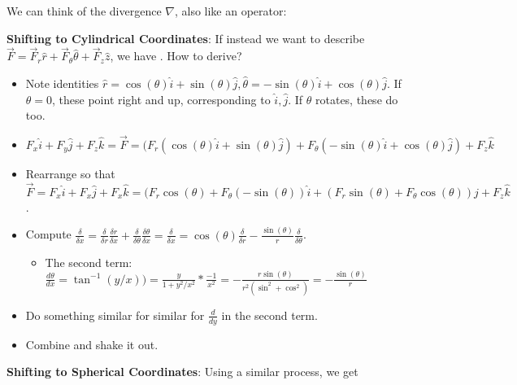 \documentclass[11pt, oneside]{article}   	%
\begin{document}
We can think of the divergence  $\nabla$, also like an operator: 
\\

\textbf{Shifting to Cylindrical Coordinates}: If instead we want to describe $\vec{F} = \vec{F}_r \hat{r} + \vec{F}_{\theta} \hat{\theta} + \vec{F}_z \hat{z}$, we have 
.  How to derive?
\begin{itemize}
\item Note identities $\hat{r} = \cos(\theta) \hat{i} + \sin(\theta) \hat{j}, \hat{\theta} = -\sin(\theta) \hat{i} + \cos(\theta) \hat{j}$.  If $\theta = 0$, these point right and up, corresponding to $\hat{i}, \hat{j}$.  If $\theta$ rotates, these do too.
\item $F_x \hat{i} + F_y \hat{j} + F_z \hat{k} = \vec{F}  = (F_r( \cos(\theta) \hat{i} + \sin(\theta) \hat{j}) + F_{\theta}(-\sin(\theta) \hat{i} + \cos(\theta) \hat{j}) + F_z \hat{k}$
\item Rearrange so that $\vec{F} =  F_x\hat{i} + F_x\hat{j} + F_x\hat{k} = (F_r\cos(\theta)   + F_{\theta}(-\sin(\theta)) \hat{i} +( F_r \sin(\theta) + F_{\theta}\cos(\theta))\hat{j} + F_z\hat{k}$.
\item Compute $\frac{\delta}{\delta x} = \frac{\delta}{\delta r} \frac{\delta r}{\delta x}  + \frac{\delta}{\delta \theta} \frac{\delta \theta}{\delta x} =
\frac{\delta}{\delta x} = \cos(\theta)  \frac{\delta}{\delta r}  - \frac{\sin(\theta)}{r} \frac{\delta}{\delta \theta} $.  
\begin{itemize}
\item The second term: $\frac{d\theta}{dx} = \tan^{-1} (y/x)) = \frac{y}{1+y^2/x^2} * \frac{-1}{ x^2} = -\frac{r\sin(\theta)}{r^2(\sin^2 + \cos^2)} = -\frac{\sin (\theta)}{ r}$
\end{itemize}
\item Do something similar for similar for $\frac{d}{dy}$ in the second term.
\item Combine and shake it out.
\end{itemize}



\textbf{Shifting to Spherical Coordinates}: Using a similar process, we get 
\\
\end{document}
